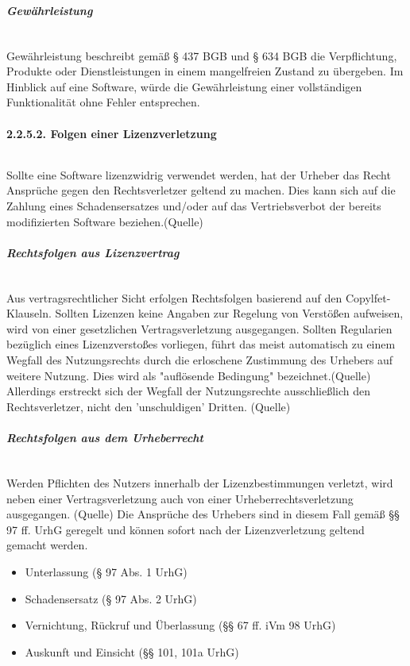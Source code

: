 \subparagraph{Gewährleistung}$~$

Gewährleistung beschreibt gemäß § 437 BGB und § 634 BGB die Verpflichtung, Produkte oder Dienstleistungen in einem mangelfreien Zustand zu übergeben. Im Hinblick auf eine Software, würde die Gewährleistung einer vollständigen Funktionalität ohne Fehler entsprechen. 

\paragraph{2.2.5.2. Folgen einer Lizenzverletzung}$~$

Sollte eine Software lizenzwidrig verwendet werden, hat der Urheber das Recht Ansprüche gegen den Rechtsverletzer geltend zu machen. Dies kann sich auf die Zahlung eines Schadensersatzes und/oder auf das Vertriebsverbot der bereits modifizierten Software beziehen.(Quelle) 

\subparagraph{Rechtsfolgen aus Lizenzvertrag}$~$

Aus vertragsrechtlicher Sicht erfolgen Rechtsfolgen basierend auf den Copylfet-Klauseln. Sollten Lizenzen keine Angaben zur Regelung von Verstößen aufweisen, wird von einer gesetzlichen Vertragsverletzung ausgegangen. Sollten Regularien bezüglich eines Lizenzverstoßes vorliegen, führt das meist automatisch zu einem Wegfall des Nutzungsrechts durch die erloschene Zustimmung des Urhebers auf weitere Nutzung. Dies wird als "auflösende Bedingung" bezeichnet.(Quelle) Allerdings erstreckt sich der Wegfall der Nutzungsrechte ausschließlich den Rechtsverletzer, nicht den 'unschuldigen' Dritten. (Quelle)

\subparagraph{Rechtsfolgen aus dem Urheberrecht}$~$

Werden Pflichten des Nutzers innerhalb der Lizenzbestimmungen verletzt, wird neben einer Vertragsverletzung auch von einer Urheberrechtsverletzung ausgegangen. (Quelle) Die Ansprüche des Urhebers sind in diesem Fall gemäß §§ 97 ff. UrhG geregelt und können sofort nach der Lizenzverletzung geltend gemacht werden. 

\begin{itemize}
    \item Unterlassung (§ 97 Abs. 1 UrhG)
    \item Schadensersatz (§ 97 Abs. 2 UrhG)
    \item Vernichtung, Rückruf und Überlassung (§§ 67 ff. iVm 98 UrhG)
    \item Auskunft und Einsicht (§§ 101, 101a UrhG)
\end{itemize}

